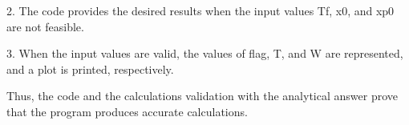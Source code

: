 \documentclass{article}
\begin{document}
{\par \medskip \par
2.	The code provides the desired results when the input values Tf, x0, and xp0 are not feasible.
\par \medskip \par
3.	When the input values are valid, the values of flag, T, and W are represented, and a plot is printed, respectively.
\par \medskip \par
Thus, the code and the calculations validation with the analytical answer prove that the program produces accurate calculations.
} 
\par \medskip

\end{document}
